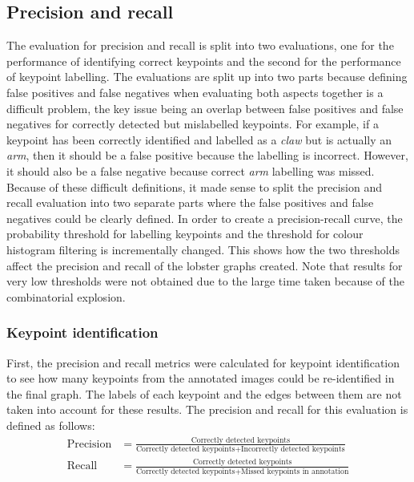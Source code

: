 \subsection{Precision and recall}
The evaluation for precision and recall is split into two evaluations, one for the performance of identifying correct keypoints and the second for the performance of keypoint labelling. The evaluations are split up into two parts because defining false positives and false negatives when evaluating both aspects together is a difficult problem, the key issue being an overlap between false positives and false negatives for correctly detected but mislabelled keypoints. For example, if a keypoint has been correctly identified and labelled as a \textit{claw} but is actually an \textit{arm}, then it should be a false positive because the labelling is incorrect. However, it should also be a false negative because correct \textit{arm} labelling was missed. Because of these difficult definitions, it made sense to split the precision and recall evaluation into two separate parts where the false positives and false negatives could be clearly defined.
\n
In order to create a precision-recall curve, the probability threshold for labelling keypoints and the threshold for colour histogram filtering is incrementally changed. This shows how the two thresholds affect the precision and recall of the lobster graphs created. Note that results for very low thresholds were not obtained due to the large time taken because of the combinatorial explosion.

\subsubsection{Keypoint identification}
First, the precision and recall metrics were calculated for keypoint identification to see how many keypoints from the annotated images could be re-identified in the final graph. The labels of each keypoint and the edges between them are not taken into account for these results. The precision and recall for this evaluation is defined as follows:
\begin{align}
\text{Precision} &= \frac{\text{Correctly detected keypoints}}{\text{Correctly detected keypoints} + \text{Incorrectly detected keypoints}} 
\\[10pt]
\text{Recall} &= \frac{\text{Correctly detected keypoints}}{\text{Correctly detected keypoints} + \text{Missed keypoints in annotation}}
\end{align}

